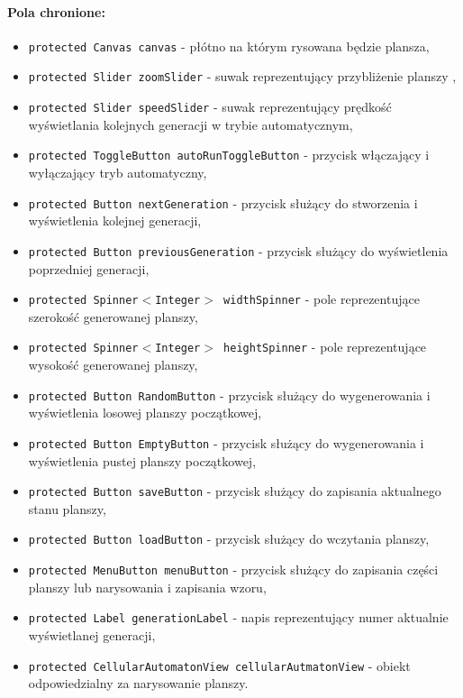 \documentclass{report}
\begin{document}
\paragraph{Pola chronione:}
\begin{itemize}
	\item \texttt{protected Canvas canvas} - płótno na którym rysowana będzie plansza,
	\item \texttt{protected Slider zoomSlider} - suwak reprezentujący przybliżenie planszy \label{sec:zoomSlider},
	\item \texttt{protected Slider speedSlider} - suwak reprezentujący prędkość wyświetlania kolejnych generacji w trybie automatycznym\label{sec:speedSlider},
	\item \texttt{protected ToggleButton autoRunToggleButton} - przycisk włączający i wyłączający tryb automatyczny,
	\item \texttt{protected Button nextGeneration} - przycisk służący do stworzenia i wyświetlenia kolejnej generacji,
	\item \texttt{protected Button previousGeneration}  - przycisk służący do  wyświetlenia poprzedniej generacji,
	\item \texttt{protected Spinner$<$Integer$>$  widthSpinner} - pole reprezentujące szerokość generowanej planszy,
	\item \texttt{protected Spinner$<$Integer$>$ heightSpinner} - pole reprezentujące wysokość generowanej planszy,
	\item \texttt{protected Button RandomButton} - przycisk służący do wygenerowania i wyświetlenia losowej planszy początkowej,
	\item \texttt{protected Button EmptyButton} - przycisk służący do wygenerowania i wyświetlenia pustej planszy początkowej,
	\item \texttt{protected Button saveButton} - przycisk służący do zapisania aktualnego stanu planszy,
	\item \texttt{protected Button loadButton} - przycisk służący do wczytania planszy,
	\item \texttt{protected MenuButton menuButton} - przycisk służący do zapisania części planszy lub narysowania i zapisania wzoru,
	\item \texttt{protected Label generationLabel} -  napis reprezentujący numer aktualnie wyświetlanej generacji,
	\item \texttt{protected CellularAutomatonView cellularAutmatonView} - obiekt odpowiedzialny za narysowanie planszy.
\end{itemize}
\end{document}
